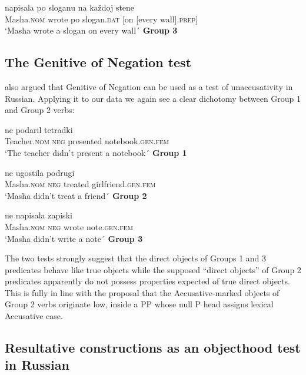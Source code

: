 \documentclass[output=paper,colorlinks,citecolor=brown]{./langscibook}
\begin{document}
\ea%
    \label{ex:antonyuk:24}
                 {napisala} {po} {sloganu}        {na}  {každoj} {stene}\\
    Masha.\textsc{nom}   wrote     po slogan.\textsc{dat} [on [every  wall].\textsc{prep}]\\
    \glt `Masha wrote a slogan on every wall´ \hfill \textbf{Group 3}
    \z

\subsection{The Genitive of Negation test}\label{sec:antonyuk:3.2}

\citet{Pesetsky1982} also argued that Genitive of Negation can be used as a test of unaccusativity in Russian. Applying it to our data we again see a clear dichotomy between Group 1 and Group 2 verbs:

\ea%
    \label{ex:antonyuk:25}
               {ne}      {podaril}     {tetradki}\\
    Teacher.\textsc{nom} \textsc{neg} presented notebook.\textsc{gen.fem}\\
    \glt `The teacher didn’t present a notebook´ \hfill \textbf{Group 1}
    \z

\ea%
    \label{ex:antonyuk:26}
               {ne}        {ugostila} {podrugi}\\
    Masha.\textsc{nom}   \textsc{neg}  treated  girlfriend.\textsc{gen.fem}\\
    \glt `Masha didn’t treat a friend´ \hfill \textbf{Group 2}
    \z

\ea%
    \label{ex:antonyuk:27}
                {ne}     {napisala} {zapiski}\\
    Masha.\textsc{nom}  \textsc{neg} wrote      note.\textsc{gen.fem}\\
    \glt `Masha didn’t write a note´ \hfill \textbf{Group 3}
    \z

The two tests strongly suggest that the direct objects of Groups 1 and 3 predicates behave like true objects while the supposed “direct objects” of Group 2 predicates apparently do not possess properties expected of true direct objects. This is fully in line with the proposal that the Accusative-marked objects of Group 2 verbs originate low, inside a PP whose null P head assigns lexical Accusative case. 

\subsection{Resultative constructions as an objecthood test in Russian}\label{sec:antonyuk:3.3}
\end{document}
